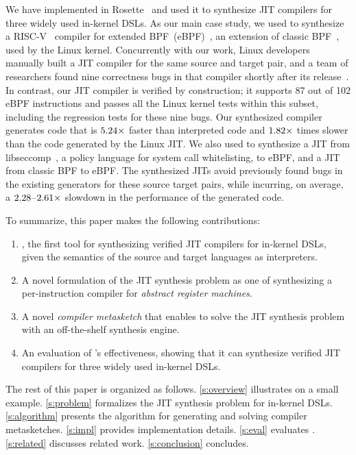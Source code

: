 We have implemented \jitsynth in Rosette~\cite{torlak:rosette} and used it to
synthesize JIT compilers for three widely used in-kernel DSLs. As our main case
study, we used \jitsynth to synthesize a RISC-V~\cite{riscv:isa} compiler for
extended BPF~(eBPF)~\cite{fleming:ebpf}, an extension of classic
BPF~\cite{mccanne:bpf}, used by the Linux kernel. Concurrently with our work,
Linux developers manually built a JIT compiler for the same source and target
pair, and a team of researchers found nine correctness bugs in that compiler
shortly after its release~\cite{nelson:serval}. In contrast, our JIT compiler is
verified by construction; it supports 87 out of 102 eBPF instructions and passes
all the Linux kernel tests within this subset, including the regression tests
for these nine bugs. Our synthesized compiler generates code that is
$5.24\times$ faster than interpreted code and
$1.82\times$ times slower than the code generated by the Linux
JIT\@. We also used  \jitsynth to synthesize a JIT from
libseccomp~\cite{edge:libseccomp}, a policy language for system call
whitelisting, to eBPF, and a JIT from classic BPF to eBPF\@. The synthesized
JITs avoid previously found bugs in the existing generators for these source
target pairs, while incurring, on average, a
$2.28$--$2.61\times$ slowdown in the performance of the
generated code.\tighten


To summarize, this paper makes the following contributions:
\begin{enumerate}
    \item \jitsynth, the first tool for synthesizing verified JIT compilers for
    in-kernel DSLs, given the semantics of the source and target languages as
    interpreters.\tighten
    \item A novel formulation of the JIT synthesis problem as one of
    synthesizing a per-instruction compiler for \emph{abstract register
    machines}.\tighten
    \item A novel \emph{compiler metasketch} that enables \jitsynth to solve the JIT
    synthesis problem with an off-the-shelf synthesis engine.
    \item An evaluation of \jitsynth's effectiveness, showing that it can
    synthesize verified JIT compilers for three widely used in-kernel DSLs.
\end{enumerate}

The rest of this paper is organized as follows.
%
\autoref{s:overview} illustrates \jitsynth on a small example.
%
\autoref{s:problem} formalizes the JIT synthesis problem for in-kernel DSLs.
%
\autoref{s:algorithm} presents the \jitsynth algorithm for generating and
solving compiler metasketches.
%
\autoref{s:impl} provides implementation details.
%
\autoref{s:eval} evaluates \jitsynth.
%
\autoref{s:related} discusses related work.
\autoref{s:conclusion} concludes.\tighten
